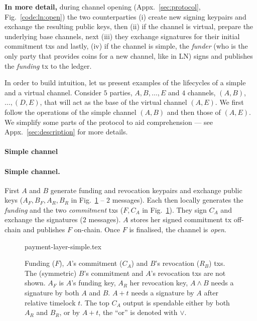   \textbf{In more detail,} during channel opening (Appx.~\ref{sec:protocol},
  Fig.~\ref{code:ln:open}) the two counterparties (i) create new signing keypairs and
  exchange the resulting public keys, then (ii) if the channel is
  virtual, prepare the underlying base channels, next (iii) they exchange
  signatures for their initial commitment txs
  and lastly, (iv) if the channel is simple, the \emph{funder} (who is the only
  party that provides coins for a new channel, like in LN) signs and publishes
  the \emph{funding} tx to the ledger.

  In order to build intuition, let us present examples of the
  lifecycles of a simple and a virtual channel. Consider $5$ parties, $A, B,
  \dots, E$ and $4$ channels, $(A, B)$, $\dots,(D, E)$, that will act as
  the base of the virtual channel $(A, E)$. We first follow the operations of
  the simple channel $(A, B)$ and then those of $(A, E)$. We simplify some parts
  of the protocol to aid comprehension --- see Appx.~\ref{sec:description} for
  more details.

  \makeatletter%
    {\paragraph{Simple channel}}%
    {\paragraph{Simple channel.}}%
  \makeatother%
  First $A$ and $B$ generate funding and revocation keypairs and exchange
  public keys ($A_F, B_F, A_R, B_R$ in Fig.~\ref{figure:payment-layer-simple} --
  $2$ messages). Each then
  locally generates the \emph{funding} and the two \emph{commitment} txs
  ($F, C_A$ in Fig.~\ref{figure:payment-layer-simple}). They
  sign $C_A$ and exchange the
  signatures ($2$ messages). $A$ stores her
  signed commitment tx off-chain and publishes $F$ on-chain. Once $F$
  is finalised, the channel is \emph{open}.

  \addtolength{\intextsep}{-15pt}
  \begin{figure}[!htbp]
    \centering
    {payment-layer-simple.tex}
    \caption{Funding ($F$), $A$'s commitment ($C_A$) and $B$'s
    revocation ($R_B$) txs.
    The (symmetric) $B$'s commitment and
    $A$'s revocation txs are not shown.
    $A_F$ is $A$'s funding key, $A_R$ her revocation key, $A \wedge B$ needs
    a signature by both $A$ and $B$. $A+t$ needs a signature
    by $A$ after relative timelock $t$. The top $C_A$ output is
    spendable either by both $A_R$ and $B_R$, or by $A + t$, the ``or'' is denoted with $\vee$.}
    \label{figure:payment-layer-simple}
  \end{figure}
  \addtolength{\intextsep}{15pt}

